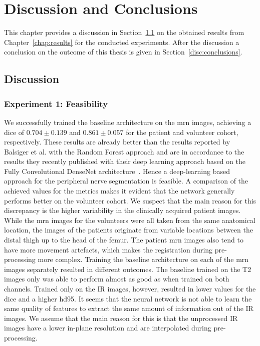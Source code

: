 \chapter{Discussion and Conclusions} \label{chap:discussion_and_conclusions}
This chapter provides a discussion in Section~\ref{disc:discussion} on the obtained results from Chapter~\ref{chap:results} for the conducted experiments. After the discussion a conclusion on the outcome of this thesis is given in Section~\ref{disc:conclusions}.

\section{Discussion} \label{disc:discussion}
\subsection{Experiment 1: Feasibility}
We successfully trained the baseline architecture on the \gls{mrn} images, achieving a \acrlong{dice} of $0.704 \pm 0.139$ and $0.861 \pm 0.057$ for the patient and volunteer cohort, respectively. These results are already better than the results reported by Balsiger et al. \cite{Balsiger2016DevelopmentApproaches} with the Random Forest approach and are in accordance to the results they recently published \cite{BalsigerContext-awareNeurography} with their deep learning approach based on the Fully Convolutional DenseNet architecture~\cite{Jegou2017TheSegmentation}. Hence a deep-learning based approach for the peripheral nerve segmentation is feasible.
A comparison of the achieved values for the metrics makes it evident that the network generally performs better on the volunteer cohort. We suspect that the main reason for this discrepancy is the higher variability in the clinically acquired patient images. While the \gls{mrn} images for the volunteers were all taken from the same anatomical location, the images of the patients originate from variable locations between the distal thigh up to the head of the femur. The patient \gls{mrn} images also tend to have more movement artefacts, which makes the registration during pre-processing more complex.
Training the baseline architecture on each of the \gls{mrn} images separately resulted in different outcomes. The baseline trained on the T2 images only was able to perform almost as good as when trained on both channels. Trained only on the IR images, however, resulted in lower values for the \acrlong{dice} and a higher \acrlong{hd95}. It seems that the neural network is not able to learn the same quality of features to extract the same amount of information out of the IR images. We assume that the main reason for this is that the unprocessed IR images have a lower in-plane resolution and are interpolated during pre-processing.
